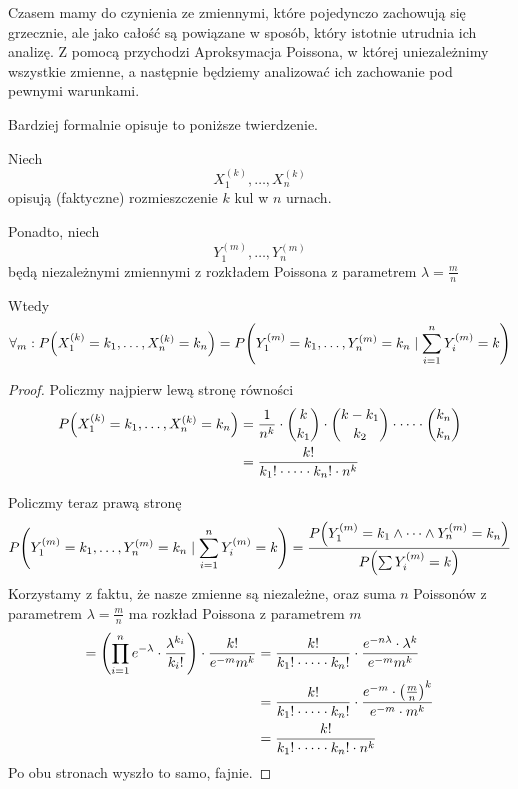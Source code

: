 Czasem mamy do czynienia ze zmiennymi, które pojedynczo zachowują się grzecznie, ale jako całość są
powiązane w sposób, który istotnie utrudnia ich analizę.
Z pomocą przychodzi Aproksymacja Poissona, w której uniezależnimy wszystkie zmienne, a następnie będziemy analizować ich zachowanie pod pewnymi warunkami.

Bardziej formalnie opisuje to poniższe twierdzenie.

\begin{theorem}[Twierdzenie 5.6 P\&C]
	\label{poisson-approximation-probability-equality}
	Niech
	\[
		X_1^{(k)}, \dots, X_n^{(k)}
	\]
	opisują (faktyczne) rozmieszczenie \( k \) kul w \( n \) urnach.

	Ponadto, niech
	\[
		Y_1^{(m)}, \dots, Y_n^{(m)}
	\]
	będą niezależnymi zmiennymi z rozkładem Poissona z parametrem \( \lambda = \frac{m}{n} \)

	Wtedy
	\[
		\forall_m : P\pars{X_1^{(k)} = k_1, \dots, X_n^{(k)} = k_n}
		= P\pars{Y_1^{(m)} = k_1, \dots, Y_n^{(m)} = k_n \mid \sum_{i=1}^n Y_i^{(m)} = k}
	\]
\end{theorem}
\begin{proof}
	Policzmy najpierw lewą stronę równości
	\begin{align*}
		P\pars{X_1^{(k)} = k_1, \dots, X_n^{(k)} = k_n}
		 & = \frac{1}{n^k} \cdot \binom{k}{k_1} \cdot \binom{k - k_1}{k_2} \cdot \dots \cdot \binom{k_n}{k_n} \\
		 & = \frac{k!}{k_1!\cdot \dots \cdot k_n! \cdot n^k}
	\end{align*}

	Policzmy teraz prawą stronę
	\[
		P\pars{Y_1^{(m)} = k_1, \dots, Y_n^{(m)} = k_n \mid \sum_{i=1}^n Y_i^{(m)} = k}
		= \frac{P\pars{Y_1^{(m)} = k_1 \land \dots \land Y_n^{(m)} = k_n}}{P\pars{\sum Y_i^{(m)} = k}}
	\]
	Korzystamy z faktu, że nasze zmienne są niezależne, oraz suma \( n \) Poissonów z parametrem \( \lambda = \frac{m}{n} \) ma rozkład Poissona z parametrem \( m \)
	\begin{align*}
		= \left(\prod_{i=1}^n e^{-\lambda}\cdot\frac{\lambda^{k_i}}{k_i!} \right) \cdot \frac{k!}{e^{-m}m^k}
		 & = \frac{k!}{k_1!\cdot \dots \cdot k_n!} \cdot \frac{e^{-n\lambda} \cdot \lambda^k}{e^{-m}m^k}           \\
		 & = \frac{k!}{k_1!\cdot \dots \cdot k_n!} \cdot \frac{e^{-m} \cdot \left(\frac{m}{n}\right)^k}{e^{-m}\cdot m^k} \\
		 & = \frac{k!}{k_1!\cdot \dots \cdot k_n! \cdot n^k}
	\end{align*}
	Po obu stronach wyszło to samo, fajnie.
\end{proof}

